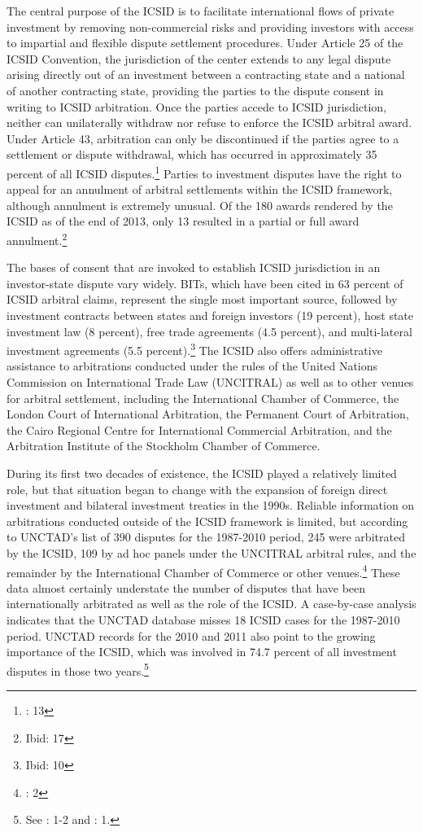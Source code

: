 \documentclass[12pt,onesided]{amsart}
\begin{document}
The central purpose of the ICSID is to facilitate international flows of private investment by removing non-commercial risks and providing investors with access to impartial and flexible dispute settlement procedures. Under Article 25 of the ICSID Convention, the jurisdiction of the center extends to any legal dispute arising directly out of an investment between a contracting state and a national of another contracting state, providing the parties to the dispute consent in writing to ICSID arbitration. Once the parties accede to ICSID jurisdiction, neither can unilaterally withdraw nor refuse to enforce the ICSID arbitral award. Under Article 43, arbitration can only be discontinued if the parties agree to a settlement or dispute withdrawal, which has occurred in approximately 35 percent of all ICSID disputes.\footnote{\citet{icsid:2014}: 13} Parties to investment disputes have the right to appeal for an annulment of arbitral settlements within the ICSID framework, although annulment is extremely unusual. Of the 180 awards rendered by the ICSID as of the end of 2013, only 13 resulted in a partial or full award annulment.\footnote{Ibid: 17}

The bases of consent that are invoked to establish ICSID jurisdiction in an investor-state dispute vary widely. BITs, which have been cited in 63 percent of ICSID arbitral claims, represent the single most important source, followed by investment contracts between states and foreign investors (19 percent), host state investment law (8 percent), free trade agreements (4.5 percent), and multi-lateral investment agreements (5.5 percent).\footnote{Ibid: 10} The ICSID also offers administrative assistance to arbitrations conducted under the rules of the United Nations Commission on International Trade Law (UNCITRAL) as well as to other venues for arbitral settlement, including the International Chamber of Commerce, the London Court of International Arbitration, the Permanent Court of Arbitration, the Cairo Regional Centre for International Commercial Arbitration, and the Arbitration Institute of the Stockholm Chamber of Commerce.

During its first two decades of existence, the ICSID played a relatively limited role, but that situation began to change with the expansion of foreign direct investment and bilateral investment treaties in the 1990s. Reliable information on arbitrations conducted outside of the ICSID framework is limited, but according to UNCTAD's list of 390 disputes for the 1987-2010 period, 245 were arbitrated by the ICSID, 109 by ad hoc panels under the UNCITRAL arbitral rules, and the remainder by the International Chamber of Commerce or other venues.\footnote{\citet{unctad:2011}: 2} These data almost certainly understate the number of disputes that have been internationally arbitrated as well as the role of the ICSID. A case-by-case analysis indicates that the UNCTAD database misses 18 ICSID cases for the 1987-2010 period. UNCTAD records for the 2010 and 2011 also point to the growing importance of the ICSID, which was involved in 74.7 percent of all investment disputes in those two years.\footnote{See \citet{unctad:2011}: 1-2 and \citet{unctad:2012}: 1.}
\end{document}

